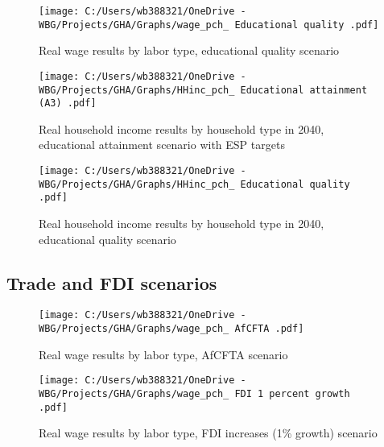 \documentclass[11pt,english]{article}
\begin{document}
\begin{figure}[ht!]\caption{Real wage results by labor type, educational quality scenario}\label{fig_wage_pch_Ed_Q1}
	\centering
	\texttt{[image: C:/Users/wb388321/OneDrive - WBG/Projects/GHA/Graphs/wage\_pch\_ Educational quality .pdf]}
\end{figure}




\begin{figure}[ht!]\caption{Real household income results by household type in 2040, educational attainment scenario with ESP targets}\label{fig_HHinc_pch_Ed_A3}
	\centering
	\texttt{[image: C:/Users/wb388321/OneDrive - WBG/Projects/GHA/Graphs/HHinc\_pch\_ Educational attainment (A3) .pdf]}
\end{figure}


\begin{figure}[ht!]\caption{Real household income results by household type in 2040, educational quality scenario} \label{fig_HHinc_pch_Ed_Q1}
	\centering
	\texttt{[image: C:/Users/wb388321/OneDrive - WBG/Projects/GHA/Graphs/HHinc\_pch\_ Educational quality .pdf]}
\end{figure}

\clearpage
\subsection{Trade and FDI scenarios}

\begin{figure}[ht!]\caption{Real wage results by labor type, AfCFTA scenario} \label{fig_AFT1_wage_pch}
	\centering
	\texttt{[image: C:/Users/wb388321/OneDrive - WBG/Projects/GHA/Graphs/wage\_pch\_ AfCFTA .pdf]}
\end{figure}


\begin{figure}[ht!]\caption{Real wage results by labor type, FDI increases (1\% growth) scenario} \label{fig_FDI1_wage_pch}
	\centering
	\texttt{[image: C:/Users/wb388321/OneDrive - WBG/Projects/GHA/Graphs/wage\_pch\_ FDI 1 percent growth .pdf]}
\end{figure}
\end{document}
